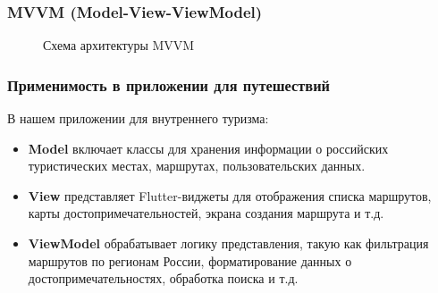\subsubsection*{MVVM (Model-View-ViewModel)}



\begin{figure}[H]
\centering
{}
\caption{Схема архитектуры MVVM}
\label{fig:mvvm}
\end{figure}


\subsubsection*{Применимость в приложении для путешествий}

В нашем приложении для внутреннего туризма:

\begin{itemize}
    \item \textbf{Model} включает классы для хранения информации о российских туристических местах, маршрутах, пользовательских данных.
    \item \textbf{View} представляет Flutter-виджеты для отображения списка маршрутов, карты достопримечательностей, экрана создания маршрута и т.д.
    \item \textbf{ViewModel} обрабатывает логику представления, такую как фильтрация маршрутов по регионам России, форматирование данных о достопримечательностях, обработка поиска и т.д.
\end{itemize}

